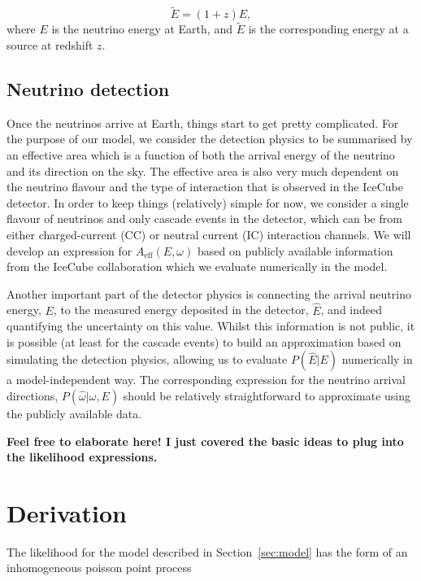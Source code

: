 \documentclass[fontsize=12pt]{article}
\begin{document}
\begin{equation}
\tilde{E} = (1+z)E,
\end{equation}
where $E$ is the neutrino energy at Earth, and $\tilde{E}$ is the corresponding energy at a source at redshift $z$.  

\subsection{Neutrino detection}

Once the neutrinos arrive at Earth, things start to get pretty complicated. For the purpose of our model, we consider the detection physics to be summarised by an effective area which is a function of both the arrival energy of the neutrino and its direction on the sky. The effective area is also very much dependent on the neutrino flavour and the type of interaction that is observed in the IceCube detector. In order to keep things (relatively) simple for now, we consider a single flavour of neutrinos and only cascade events in the detector, which can be from either charged-current (CC) or neutral current (IC) interaction channels. We will develop an expression for $A_\mathrm{eff}(E, \omega)$ based on publicly available information from the IceCube collaboration which we evaluate numerically in the model. 

Another important part of the detector physics is connecting the arrival neutrino energy, $E$, to the measured energy deposited in the detector, $\hat{E}$, and indeed quantifying the uncertainty on this value. Whilst this information is not public, it is possible (at least for the cascade events) to build an approximation based on simulating the detection physics, allowing us to evaluate $P(\hat{E} | E)$ numerically in a model-independent way. The corresponding expression for the neutrino arrival directions, $P(\hat{\omega} | \omega, E)$ should be relatively straightforward to approximate using the publicly available data.

\textbf{Feel free to elaborate here! I just covered the basic ideas to plug into the likelihood expressions.}
 
\section{Derivation}

The likelihood for the model described in Section~\ref{sec:model} has the form of an inhomogeneous poisson point process
\end{document}
